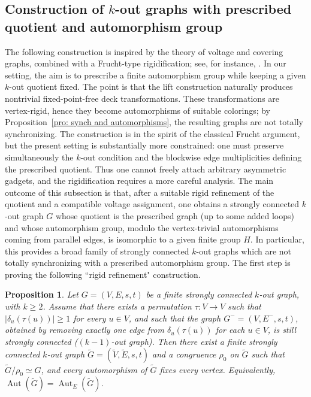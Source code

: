\documentclass[a4paper,10pt]{amsart}
\theoremstyle{plain}
\newtheorem{proposition}[theorem]{Proposition}
\theoremstyle{definition}
\DeclareMathOperator{\Aut}{Aut}
\begin{document}
\subsection{Construction of $k$-out graphs with prescribed quotient and automorphism group}

The following construction is inspired by the theory of voltage and covering graphs, combined with a Frucht-type rigidification; see, for instance, \cite[Ch.~2]{GrossTuckerTGT}. In our setting, the aim is to prescribe a finite automorphism group while keeping a given $k$-out quotient fixed. The point is that the lift construction naturally produces nontrivial fixed-point-free deck transformations. These transformations are vertex-rigid, hence they become automorphisms of suitable colorings; by Proposition~\ref{pro: synch and automorphisms}, the resulting graphs are not totally synchronizing.
The construction is in the spirit of the classical Frucht argument, but the present setting is substantially more constrained: one must preserve simultaneously the $k$-out condition and the blockwise edge multiplicities defining the prescribed quotient. Thus one cannot freely attach arbitrary asymmetric gadgets, and the rigidification requires a more careful analysis.
The main outcome of this subsection is that, after a suitable rigid refinement of the quotient and a compatible voltage assignment, one obtains a strongly connected $k$-out graph $G$ whose quotient is the prescribed graph (up to some added loops) and whose automorphism group, modulo the vertex-trivial automorphisms coming from parallel edges, is isomorphic to a given finite group $H$. In particular, this provides a broad family of strongly connected $k$-out graphs which are not totally synchronizing with a prescribed automorphism group. The first step is proving the following ``rigid refinement" construction.
\begin{proposition}\label{prop:vertex-rigid-refinement-permutation}
Let $G=(V,E,s,t)$ be a finite strongly connected $k$-out graph, with $k\ge 2$.
Assume that there exists a permutation $\tau:V\to V$ such that $|\delta_u(\tau(u))|\ge 1$ for every $u\in V$, and such that the graph $G^-=(V,E^-,s,t)$, obtained by removing exactly one edge from $\delta_u(\tau(u))$ for each $u\in V$, is still strongly connected ($(k-1)$-out graph). Then there exist a finite strongly connected $k$-out graph $\widetilde G=(\widetilde V,\widetilde E,s,t)$ and a congruence $\rho_0$ on $\widetilde G$ such that $\widetilde G/\rho_0 \simeq G$, 
and every automorphism of $\widetilde G$ fixes every vertex. Equivalently, $\Aut(\widetilde G)=\Aut_E(\widetilde G)$.
\end{proposition}
\end{document}

